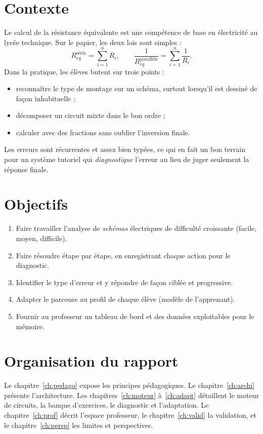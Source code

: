 \documentclass[11pt,a4paper]{report}
\newcommand{\req}{R_{eq}}
\begin{document}
\section{Contexte}
Le calcul de la résistance équivalente est une compétence de base en électricité au lycée technique. Sur le papier, les deux lois sont simples :
\begin{equation}
  \req^{\text{série}} = \sum_{i=1}^{n} R_i,
  \qquad
  \frac{1}{\req^{\text{parallèle}}} = \sum_{i=1}^{n} \frac{1}{R_i}.
\end{equation}
Dans la pratique, les élèves butent sur trois points :
\begin{itemize}
  \item reconnaître le type de montage sur un schéma, surtout lorsqu'il est dessiné de façon inhabituelle ;
  \item décomposer un circuit mixte dans le bon ordre ;
  \item calculer avec des fractions sans oublier l'inversion finale.
\end{itemize}
Les erreurs sont récurrentes et assez bien typées, ce qui en fait un bon terrain pour un système tutoriel qui \emph{diagnostique} l'erreur au lieu de juger seulement la réponse finale.

\section{Objectifs}
\begin{enumerate}[label=\textbf{O\arabic*.}]
  \item Faire travailler l'analyse de \emph{schémas} électriques de difficulté croissante (facile, moyen, difficile).
  \item Faire résoudre étape par étape, en enregistrant chaque action pour le diagnostic.
  \item Identifier le type d'erreur et y répondre de façon ciblée et progressive.
  \item Adapter le parcours au profil de chaque élève (modèle de l'apprenant).
  \item Fournir au professeur un tableau de bord et des données exploitables pour le mémoire.
\end{enumerate}

\section{Organisation du rapport}
Le chapitre~\ref{ch:pedago} expose les principes pédagogiques. Le chapitre~\ref{ch:archi} présente l'architecture. Les chapitres~\ref{ch:moteur} à~\ref{ch:adapt} détaillent le moteur de circuits, la banque d'exercices, le diagnostic et l'adaptation. Le chapitre~\ref{ch:prof} décrit l'espace professeur, le chapitre~\ref{ch:valid} la validation, et le chapitre~\ref{ch:persp} les limites et perspectives.
\end{document}
